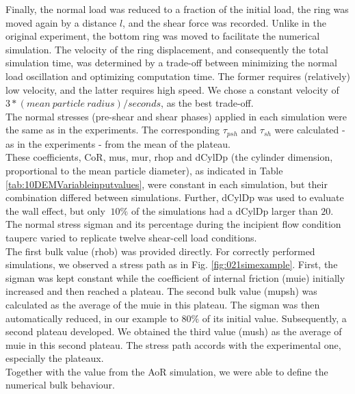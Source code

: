 Finally, the normal load was reduced to a fraction of the initial load, 
the ring was moved again by a distance $l$, and the shear force was recorded. 
Unlike in the original experiment, the bottom ring was moved to facilitate the numerical simulation. 
The velocity of the ring displacement, and consequently the total simulation time, 
was determined by a trade-off between minimizing the normal load oscillation and
optimizing computation time. 
The former requires (relatively) low velocity, and the latter requires high
speed.
We chose a constant velocity of $3*(mean ~ particle ~ radius)/seconds$, as the
best trade-off.\\
The normal stresses (pre-shear and shear phases) applied in each simulation were
the same as in the experiments.
The corresponding $\tau_{psh}$ and $\tau_{sh}$ were calculated - as in the experiments - from the mean of the plateau.\\
These coefficients, \acs{CoR}, \acs{mus}, \acs{mur},
\acs{rhop} and \acs{dCylDp} (the cylinder dimension, proportional to the mean
particle diameter), as indicated in Table \ref{tab:10DEMVariableinputvalues}, 
were constant in each simulation, but their combination differed between
simulations.
Further, \acs{dCylDp} was used to evaluate the wall effect, but only $~10\%$ of the
simulations had a \acs{dCylDp} larger than $20$.
The normal stress \acs{sigman} and its
percentage during the incipient flow condition \acs{tauperc}
varied to replicate twelve shear-cell load conditions.\\ 
The first bulk value (\acs{rhob}) was provided directly. 
For correctly performed simulations, we
observed a stress path as in Fig. \ref{fig:021simexample}.
First, the \acs{sigman} was kept constant while the coefficient of internal
friction (\acs{muie}) initially increased and then reached a plateau.
The second bulk value (\acs{mupsh}) was calculated as the average of the
\acs{muie} in this plateau.
The \acs{sigman} was then automatically reduced, in our example to $80 \%$ of
its initial value.
Subsequently, a second plateau developed.
We obtained the third
value (\acs{mush}) as the average of \acs{muie} in this second plateau.
The stress path accords with the experimental one, especially the plateaux.\\
Together with the value from the \acs{AoR} simulation, we were able to define
the numerical bulk behaviour.

